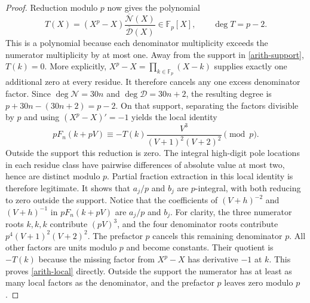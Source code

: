 \documentclass[11pt]{article}
\newcommand{\Fp}{\mathbb F_p}
\begin{document}
\begin{proof}
Reduction modulo $p$ now gives the polynomial
\[
 T(X)=(X^p-X)\frac{\overline{\mathcal N}(X)}
 {\overline{\mathcal D}(X)}\in\Fp[X],\qquad \deg T=p-2.
\]
This is a polynomial because each denominator multiplicity exceeds the
numerator multiplicity by at most one. Away from the support in
\eqref{arith-support}, $T(k)=0$.
More explicitly, $X^p-X=\prod_{k\in\Fp}(X-k)$ supplies exactly one
additional zero at every residue. It therefore cancels any one excess
denominator factor. Since $\deg\mathcal N=30n$ and
$\deg\mathcal D=30n+2$, the resulting degree is $p+30n-(30n+2)=p-2$.
On that support, separating the factors divisible by $p$ and using
$(X^p-X)'=-1$ yields the local identity
\begin{equation}\label{arith-local}
 pF_n(k+pV)\equiv-T(k)\frac{V^3}{(V+1)^2(V+2)^2}\pmod p.
\end{equation}
Outside the support this reduction is zero. The integral high-digit
pole locations in each residue class have pairwise differences of
absolute value at most two, hence are distinct modulo $p$. Partial
fraction extraction in this local identity is therefore legitimate.
It shows that $a_j/p$ and $b_j$ are $p$-integral, with both reducing
to zero outside the support. Notice that the coefficients of
$(V+h)^{-2}$ and $(V+h)^{-1}$ in $pF_n(k+pV)$ are $a_j/p$ and $b_j$.
For clarity, the three numerator roots $k,k,k$ contribute $(pV)^3$,
and the four denominator roots contribute
$p^4(V+1)^2(V+2)^2$. The prefactor $p$ cancels this remaining denominator
$p$. All other factors are units modulo $p$ and become constants.
Their quotient is $-T(k)$ because the missing factor from $X^p-X$
has derivative $-1$ at $k$. This proves \eqref{arith-local} directly.
Outside the support the numerator has at least as many local factors
as the denominator, and the prefactor $p$ leaves zero modulo $p$.


\end{proof}
\end{document}
